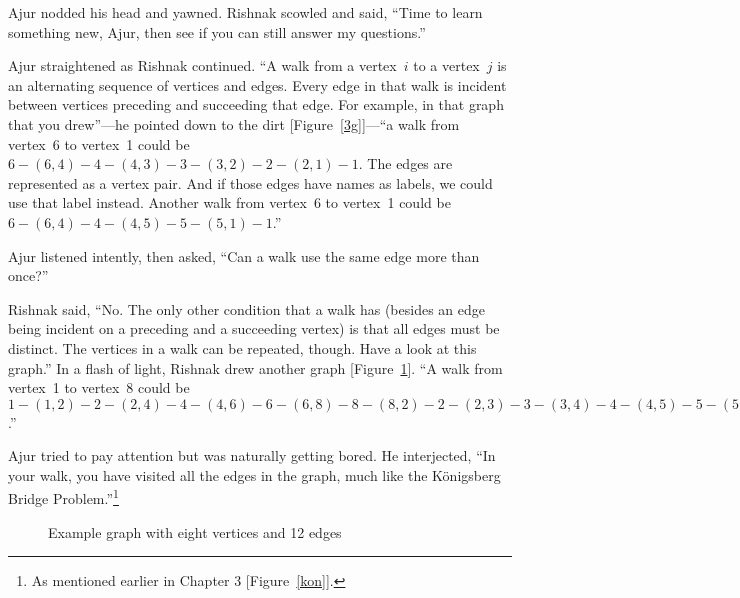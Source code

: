 Ajur nodded his head and yawned.
Rishnak scowled and said, ``Time to learn something new, Ajur, then see if you can still answer my questions.''

Ajur straightened as Rishnak continued. ``A walk from a vertex~$i$ to a vertex~$j$ is an alternating sequence of vertices and edges. Every edge in that walk is incident between vertices preceding and succeeding that edge. For example, in that graph that you drew''---he pointed down to the dirt [Figure~\ref{3g}]---``a walk from vertex~6 to vertex~1 could be $6-(6,4)-4-(4,3)-3-(3,2)-2-(2,1)-1$. The edges are represented as a vertex pair. And if those edges have names as labels, we could use that label instead. Another walk from vertex~6 to vertex~1 could be $6-(6,4)-4-(4,5)-5-(5,1)-1$.''

Ajur listened intently, then asked, ``Can a walk use the same edge more than once?''

Rishnak said, ``No. The only other condition that a walk has (besides an edge being incident on a preceding and a succeeding vertex) is that all edges must be distinct. The vertices in a walk can be repeated, though. Have a look at this graph.'' In a flash of light, Rishnak drew another graph [Figure~\ref{3g3}]. ``A walk from vertex~1 to vertex~8 could be $1-(1,2)-2-(2,4)-4-(4,6)-6-(6,8)-8-(8,2)-2-(2,3)-3-(3,4)-4-(4,5)-5-(5,6)-6-(6,7)-7-(7,8)-8$.''

Ajur tried to pay attention but was naturally getting bored. He interjected, ``In your walk, you have visited all the edges in the graph, much like the K\"{o}nigsberg Bridge Problem.''\footnote{As mentioned earlier in Chapter 3 [Figure~\ref{kon}].}

\begin{figure}
\begin{center}
\caption{Example graph with eight vertices and 12 edges}\label{3g3}
\end{center}
\end{figure}

